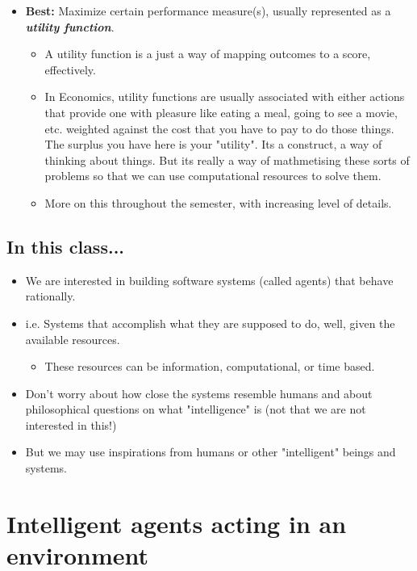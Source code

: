 \documentclass[12pt]{article}
\begin{document}
\begin{itemize}
\begin{itemize}
\begin{itemize}
        \end{itemize}
        \item \textbf{Best:} Maximize certain performance measure(s), usually represented as a \textbf{\emph{utility function}}. 
        \begin{itemize}
            \item A utility function is a just a way of mapping outcomes to a score, effectively.
            \item In Economics, utility functions are usually associated with either actions that provide one with pleasure like eating a meal, going to see a movie, etc. weighted against the cost that you have to pay to do those things. The surplus you have here is your "utility". Its a construct, a way of thinking about things. But its really a way of mathmetising these sorts of problems so that we can use computational resources to solve them. 
            \item More on this throughout the semester, with increasing level of details.
        \end{itemize}
    \end{itemize}
\end{itemize}

\newline
\subsection{In this class...}

\begin{itemize}
    \item We are interested in building software systems (called agents) that behave rationally.
    \item i.e. Systems that accomplish what they are supposed to do, well, given the available resources.
    \begin{itemize}
        \item These resources can be information, computational, or time based. 
    \end{itemize}
    \item Don't worry about how close the systems resemble humans and about philosophical questions on what "intelligence" is (not that we are not interested in this!)
    \item But we may use inspirations from humans or other "intelligent" beings and systems.
\end{itemize}

\newpage
\section{Intelligent agents acting in an environment}
\end{document}
